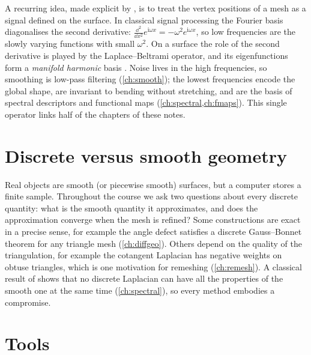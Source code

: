 A recurring idea, made explicit by \citet{Taubin1995,Taubin2000}, is to treat the vertex
positions of a mesh as a signal defined on the surface. In classical signal processing the
Fourier basis diagonalises the second derivative: $\frac{\dd^2}{\dd x^2}e^{\mathrm{i}\omega x}=
-\omega^2e^{\mathrm{i}\omega x}$, so low frequencies are the slowly varying functions with small
$\omega^2$. On a surface the role of the second derivative is played by the Laplace--Beltrami
operator, and its eigenfunctions form a \emph{manifold harmonic} basis \citep{Vallet2008}. Noise
lives in the high frequencies, so smoothing is low-pass filtering (\cref{ch:smooth}); the lowest
frequencies encode the global shape, are invariant to bending without stretching, and are the
basis of spectral descriptors and functional maps (\cref{ch:spectral,ch:fmaps}). This single
operator links half of the chapters of these notes.


\section{Discrete versus smooth geometry}

Real objects are smooth (or piecewise smooth) surfaces, but a computer stores a finite sample.
Throughout the course we ask two questions about every discrete quantity: what is the smooth
quantity it approximates, and does the approximation converge when the mesh is refined? Some
constructions are exact in a precise sense, for example the angle defect satisfies a discrete
Gauss--Bonnet theorem for any triangle mesh (\cref{ch:diffgeo}). Others depend on the quality of
the triangulation, for example the cotangent Laplacian has negative weights on obtuse triangles,
which is one motivation for remeshing (\cref{ch:remesh}). A classical result of
\citet{Wardetzky2007} shows that no discrete Laplacian can have all the properties of the smooth
one at the same time (\cref{ch:spectral}), so every method embodies a compromise.

\section{Tools}

